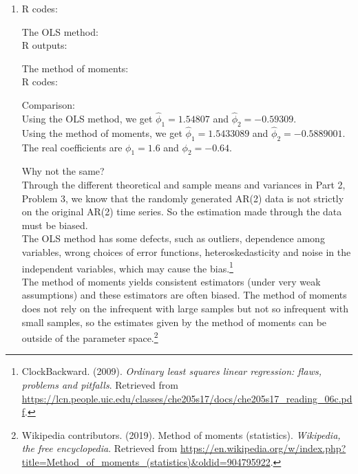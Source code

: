\documentclass[10pt]{article}
\begin{document}
\begin{enumerate}[1)]
\item
R codes:

The OLS method:\\
R outputs:

The method of moments:\\
R codes:

Comparison:\\
Using the OLS method, we get $\hat{\phi}_1=1.54807$ and $\hat{\phi}_2=-0.59309$.\\
Using the method of moments, we get $\hat{\phi}_1=1.5433089$ and $\hat{\phi}_2=-0.5889001$.\\
The real coefficients are $\phi_1=1.6$ and $\phi_2=-0.64$.

Why not the same?\\
Through the different theoretical and sample means and variances in Part 2, Problem 3, we know that the randomly generated AR(2) data is not strictly on the original AR(2) time series. So the estimation made through the data must be biased.\\
The OLS method has some defects, such as outliers, dependence among variables, wrong choices of error functions, heteroskedasticity and noise in the independent variables, which may cause the bias.\footnote{ ClockBackward. (2009). \textit{Ordinary least squares linear regression: flaws, problems and pitfalls}. Retrieved from \url{https://lcn.people.uic.edu/classes/che205s17/docs/che205s17_reading_06c.pdf}.}\\
The method of moments yields consistent estimators (under very weak assumptions) and these estimators are often biased. The method of moments does not rely on the infrequent with large samples but not so infrequent with small samples, so the estimates given by the method of moments can be outside of the parameter space.\footnote{ Wikipedia contributors. (2019). Method of moments (statistics). \textit{Wikipedia, the free encyclopedia}. Retrieved from \url{https://en.wikipedia.org/w/index.php?title=Method_of_moments_(statistics)&oldid=904795922}.}

\end{enumerate}
\vspace{3mm}
\end{document}
